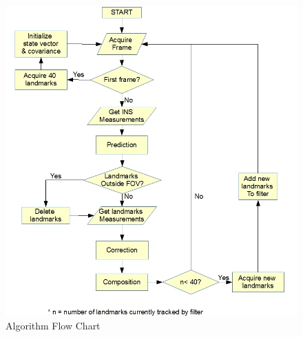 \begin{figure}[h]
\centering
\includegraphics[width=14cm, keepaspectratio=true]{./Figures/flow_chart.jpg}
\caption{Algorithm Flow Chart}
\label{fig:flowchart}
\end{figure}



